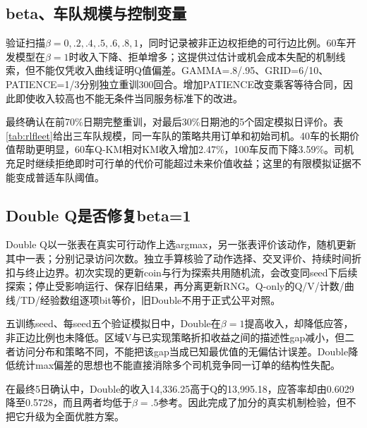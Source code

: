 \subsection{beta、车队规模与控制变量}
验证扫描$\beta=0,.2,.4,.5,.6,.8,1$，同时记录被非正边权拒绝的可行边比例。60车开发模型在$\beta=1$时收入下降、拒单增多；这提供过估计或机会成本失配的机制线索，但不能仅凭收入曲线证明Q值偏差。GAMMA=.8/.95、GRID=6/10、PATIENCE=1/3分别独立重训300回合。增加PATIENCE改变乘客等待合同，因此即使收入较高也不能无条件当同服务标准下的改进。



最终确认在前70\%日期完整重训，对最后30\%日期池的5个固定模拟日评价。表\ref{tab:rlfleet}给出三车队规模，同一车队的策略共用订单和初始司机。40车的长期价值帮助更明显，60车Q-KM相对KM收入增加2.47\%，100车反而下降3.59\%。司机充足时继续拒绝即时可行单的代价可能超过未来价值收益；这里的有限模拟证据不能变成普适车队阈值。



\subsection{Double Q是否修复beta=1}
Double Q以一张表在真实可行动作上选argmax，另一张表评价该动作，随机更新其中一表；分别记录访问次数。独立手算核验了动作选择、交叉评价、持续时间折扣与终止边界。初次实现的更新coin与行为探索共用随机流，会改变同seed下后续探索；停止受影响运行、保存旧结果，再分离更新RNG。Q-only的Q/V/计数/曲线/TD/经验数组逐项bit等价，旧Double不用于正式公平对照。

五训练seed、每seed五个验证模拟日中，Double在$\beta=1$提高收入，却降低应答，非正边比例也未降低。区域V与已实现策略折扣收益之间的描述性gap减小，但二者访问分布和策略不同，不能把该gap当成已知最优值的无偏估计误差。Double降低统计max偏差的思想\cite{double}也不能直接消除多个司机竞争同一订单的结构性失配。

在最终5日确认中，Double的收入14,336.25高于Q的13,995.18，应答率却由0.6029降至0.5728，而且两者均低于$\beta=.5$参考。因此完成了加分的真实机制检验，但不把它升级为全面优胜方案。

